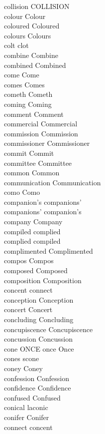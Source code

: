 collision COLLISION\\
colour Colour\\
coloured Coloured\\
colours Colours\\
colt clot\\
combine Combine\\
combined Combined\\
come Come\\
comes Comes\\
cometh Cometh\\
coming Coming\\
comment Comment\\
commercial Commercial\\
commission Commission\\
commissioner Commissioner\\
commit Commit\\
committee Committee\\
common Common\\
communication Communication\\
como Como\\
companion's companions'\\
companions' companion's\\
company Company\\
compiled complied\\
complied compiled\\
complimented Complimented\\
compos Compos\\
composed Composed\\
composition Composition\\
concent connect\\
conception Conception\\
concert Concert\\
concluding Concluding\\
concupiscence Concupiscence\\
concussion Concussion\\
cone ONCE once Once\\
cones scone\\
coney Coney\\
confession Confession\\
confidence Confidence\\
confused Confused\\
conical laconic\\
conifer Conifer\\
connect concent\\
